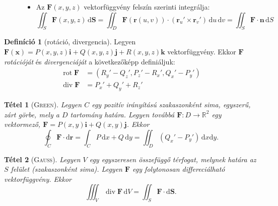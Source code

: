 \documentclass[%
	DIV=15,appendixprefix]{scrreprt}
\newtheorem*{tetel}{Tétel}
\theoremstyle{definition}
\newtheorem*{defin}{Definíció}
\theoremstyle{remark}
\DeclareMathOperator{\rot}{rot}
\DeclareMathOperator{\diver}{div}
\begin{document}
\begin{description}
\begin{itemize}
\begin{equation*}
				\end{equation*}
			\item Az $ \mathbf{ F } \left( x,{} y,{} z \right) $ vektorfüggvény felszín szerinti
			integrálja:
				\begin{equation*}
					\iint_{ S } \mathbf{ F } \left( x,{} y,{} z \right) \, \mathrm{ d } \mathbf{ S }
					= \iint_{ D } \mathbf{ F } \left( \mathbf{ r } \left( u,{} v \right) \right)
					\cdot \left( \mathbf{r}_{ u }' \times \mathbf{r}_{ v }'\right) \, \mathrm{ d }
					u \, \mathrm{ d } v = \iint_{ S } \mathbf{ F } \cdot \mathbf{ n } \,
					\mathrm{ d } S
				\end{equation*}
		\end{itemize}
\end{description}
%
\begin{defin}[rotáció, divergencia]
	Legyen $ \mathbf{ F } \left( \mathbf{ x } \right) = P \left( x,{} y,{} z \right) \mathbf{ i } +
	Q \left( x,{} y,{} z \right) \mathbf{ j } + R \left( x,{} y,{} z \right) \mathbf{ k } $
	vektorfüggvény. Ekkor $ \mathbf{ F } $ \emph{rotációját} és \emph{divergenciáját} a
	következőképp definiáljuk:
	\begin{align}
		\rot \mathbf{ F } &= \left( R_{ y }' - Q_{ z }',{} P_{ z }' - R_{ x }', Q_{ x }' - P_{ y }'
		\right)\tag{vektorfüggvény}\\
		\diver \mathbf{ F } &= P_{ x }' + Q_{ y }' + R_{ z }'\tag{skalárfüggvény}
	\end{align}
\end{defin}
\begin{tetel}[\textsc{Green}]
	Legyen $ C $ egy pozitív irányítású szakaszonként sima, egyszerű, zárt görbe, mely a $ D $
	tartomány határa. Legyen továbbá $ \mathbf{F} \colon D \rightarrow
	\mathbb{ R }^{ 2 } $ egy vektormező, $ \mathbf{ F } = P \left( x,{} y \right) \mathbf{ i } + Q
	\left( x,{} y \right) \mathbf{ j } $. Ekkor
	\begin{equation*}
		\oint_{ C } \mathbf{ F } \cdot \mathrm{ d } \mathbf{ r } = \int_{ C } P \, \mathrm{ d } x +
		Q \, \mathrm{ d } y = \iint_{ D } \left( Q_{ x }' - P_{ y }' \right) \, \mathrm{ d } x
		\mathrm{ d } y.
	\end{equation*}
\end{tetel}
\begin{tetel}[\textsc{Gauss}]
	Legyen $ V $ egy egyszeresen összefüggő térfogat, melynek határa az $ S $ felület (szakaszonként
	sima). Legyen $ \mathbf{ F } $ egy folytonosan differeciálható vektorfüggvény. Ekkor
	\begin{equation*}
		\iiint_{ V } \diver \mathbf{ F } \,\mathrm{ d } V = \iint_{ S } \mathbf{F} \cdot
		\mathrm{ d } \mathbf{ S }.
	\end{equation*}
\end{tetel}
\end{document}

